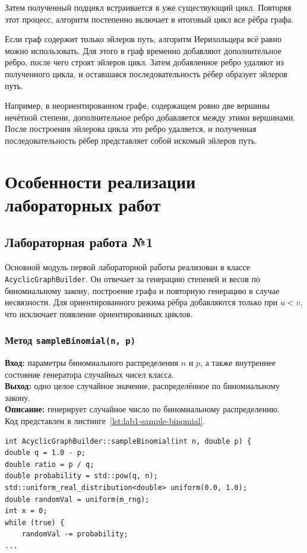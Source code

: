 \documentclass[14pt,a4paper]{extarticle}
\newcommand{\funcblock}[5]{%
\subsubsection*{Метод \code{#1}}
\noindent
\textbf{Вход:} #2\\
\textbf{Выход:} #3\\
\textbf{Описание:} #4\\
Код представлен в листинге~\ref{#5}.%
}
\newcommand{\code}[1]{\texttt{#1}}
\begin{document}
Затем полученный подцикл встраивается в уже существующий цикл. Повторяя этот процесс, алгоритм постепенно включает в итоговый цикл все рёбра графа.

Если граф содержит только эйлеров путь, алгоритм Иерихольцера всё равно можно использовать. Для этого в граф временно добавляют дополнительное ребро, после чего строят эйлеров цикл. Затем добавленное ребро удаляют из полученного цикла, и оставшаяся последовательность рёбер образует эйлеров путь.

Например, в неориентированном графе, содержащем ровно две вершины нечётной степени, дополнительное ребро добавляется между этими вершинами. После построения эйлерова цикла это ребро удаляется, и полученная последовательность рёбер представляет собой искомый эйлеров путь.

\newpage
\section{Особенности реализации лабораторных работ}

\subsection{Лабораторная работа №1}

Основной модуль первой лабораторной работы реализован в классе \code{AcyclicGraphBuilder}. Он отвечает за генерацию степеней и весов по биномиальному закону, построение графа и повторную генерацию в случае несвязности. Для ориентированного режима рёбра добавляются только при \(u < v\), что исключает появление ориентированных циклов.

\funcblock
{sampleBinomial(n, p)}
{параметры биномиального распределения \(n\) и \(p\), а также внутреннее состояние генератора случайных чисел класса.}
{одно целое случайное значение, распределённое по биномиальному закону.}
{генерирует случайное число по биномиальному распределению.}
{lst:lab1-sample-binomial}
\begin{lstlisting}[style=cppcode,caption={Фрагмент функции \code{sampleBinomial(n, p)}},label={lst:lab1-sample-binomial}]
int AcyclicGraphBuilder::sampleBinomial(int n, double p) {
double q = 1.0 - p;
double ratio = p / q;
double probability = std::pow(q, n);
std::uniform_real_distribution<double> uniform(0.0, 1.0);
double randomVal = uniform(m_rng);
int x = 0;
while (true) {
    randomVal -= probability;
...
\end{lstlisting}
\end{document}

